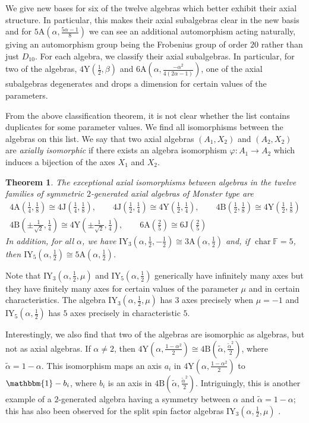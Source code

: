 \documentclass[11pt, a4paper]{article}
\theoremstyle{plain}
\newtheorem*{theorem*}{Theorem}
\theoremstyle{definition}
\newcommand\al{\alpha}
\newcommand\bt{\beta}
\DeclareMathOperator{\ch}{char}
\newcommand\FF{\mathbb{F}}
\newcommand{\A}{\mathrm{A}}
\newcommand{\B}{\mathrm{B}}
\newcommand{\J}{\mathrm{J}}
\newcommand{\Y}{\mathrm{Y}}
\newcommand{\IY}{\mathrm{IY}}
\newcommand{\0}{\overline{0}}
\newcommand{\2}{\overline{2}}
\renewcommand{\phi}{\varphi}
\newcommand{\1}{\mathbbm{1}}
\begin{document}
We give new bases for six of the twelve algebras which better exhibit their axial structure.  In particular, this makes their axial subalgebras clear in the new basis and for $5\A(\al, \frac{5\al-1}{8})$ we can see an additional automorphism acting naturally, giving an automorphism group being the Frobenius group of order $20$ rather than just $D_{10}$.  For each algebra, we classify their axial subalgebras.  In particular, for two of the algebras, $4\Y(\frac{1}{2},\bt)$ and $6\A(\al, \frac{-\al^2}{4(2\al-1)})$, one of the axial subalgebras degenerates and drops a dimension for certain values of the parameters.

From the above classification theorem, it is not clear whether the list contains duplicates for some parameter values.  We find all isomorphisms between the algebras on this list.  We say that two axial algebras $(A_1, X_2)$ and $(A_2,X_2)$ are \emph{axially isomorphic} if there exists an algebra isomorphism $\phi \colon A_1 \to A_2$ which induces a bijection of the axes $X_1$ and $X_2$.

\begin{theorem*}
The exceptional axial isomorphisms between algebras in the twelve families of symmetric $2$-generated axial algebras of Monster type are
\[
\begin{gathered}
4\A(\tfrac{1}{4}, \tfrac{1}{8}) \cong 4\J(\tfrac{1}{4}, \tfrac{1}{8}), \qquad 4\J(\tfrac{1}{2}, \tfrac{1}{4}) \cong 4\Y(\tfrac{1}{2}, \tfrac{1}{4}), \qquad 4\B(\tfrac{1}{2}, \tfrac{1}{8}) \cong 4\Y(\tfrac{1}{2}, \tfrac{1}{8}) \\
4\B(\pm \tfrac{1}{\sqrt{2}}, \tfrac{1}{4}) \cong 4\Y(\pm \tfrac{1}{\sqrt{2}}, \tfrac{1}{4}), \qquad 6\A(\tfrac{2}{5}) \cong 6\J(\tfrac{2}{5})
\end{gathered}
\]
In addition, for all $\al$, we have $\IY_3(\al,\frac{1}{2},-\frac{1}{2}) \cong 3\A(\al, \frac{1}{2})$ and, if $\ch \FF = 5$, then $\IY_5(\al, \frac{1}{2}) \cong 5\A(\al, \frac{1}{2})$.
\end{theorem*}

Note that $\IY_3(\al,\frac{1}{2}, \mu)$ and $\IY_5(\al,\frac{1}{2})$ generically have infinitely many axes but they have finitely many axes for certain values of the parameter $\mu$ and in certain characteristics.  The algebra $\IY_3(\al,\frac{1}{2}, \mu)$ has $3$ axes precisely when $\mu = -1$ and $\IY_5(\al,\frac{1}{2})$ has $5$ axes precisely in characteristic $5$.

Interestingly, we also find that two of the algebras are isomorphic as algebras, but not as axial algebras.  If $\al \neq 2$, then $4\Y(\al, \frac{1-\al^2}{2}) \cong 4\B(\tilde{\al}, \frac{\tilde{\al}^2}{2})$, where $\tilde{\al} = 1 - \al$.  This isomorphism maps an axis $a_i$ in $4\Y(\al, \frac{1-\al^2}{2})$ to $\1 - b_i$, where $b_i$ is an axis in $4\B(\tilde{\al}, \frac{\tilde{\al}^2}{2})$.  Intriguingly, this is another example of a $2$-generated algebra having a symmetry between $\al$ and $\tilde{\al} = 1 - \al$; this has also been observed for the split spin factor algebras $\IY_3(\al,\frac{1}{2}, \mu)$ \cite{splitspin}.
\end{document}
